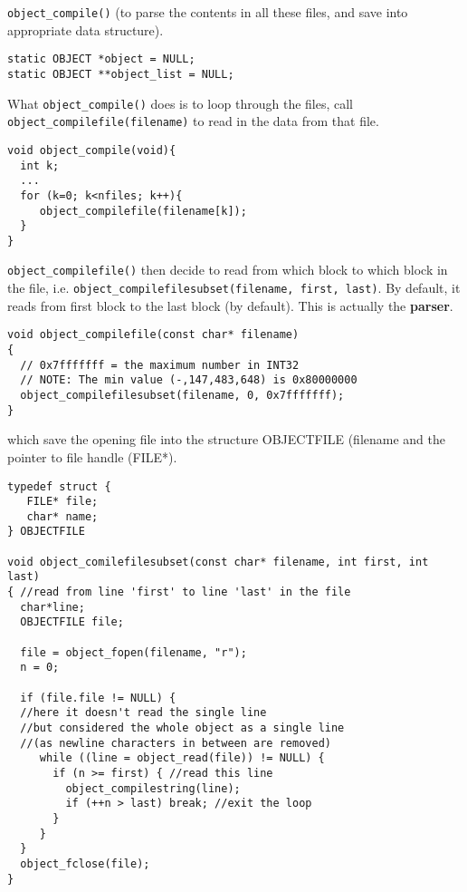 \verb!object_compile()! (to parse the contents in all these files, and save into
appropriate data structure).
\begin{verbatim}
static OBJECT *object = NULL;
static OBJECT **object_list = NULL;
\end{verbatim}
What \verb!object_compile()! does is to loop through the files, call
\verb!object_compilefile(filename)! to read in the data from that file.
\begin{verbatim}
void object_compile(void){
  int k;
  ...
  for (k=0; k<nfiles; k++){
     object_compilefile(filename[k]);
  }
}
\end{verbatim}

\verb!object_compilefile()! then decide to read from which block to which block
in the file, i.e. \verb!object_compilefilesubset(filename, first, last)!. By
default, it reads from first block to the last block (by default). This is
actually the {\bf parser}.
\begin{verbatim}
void object_compilefile(const char* filename)
{
  // 0x7fffffff = the maximum number in INT32
  // NOTE: The min value (-,147,483,648) is 0x80000000
  object_compilefilesubset(filename, 0, 0x7fffffff);
}
\end{verbatim}
which save the opening file into the structure OBJECTFILE (filename and the
pointer to file handle (FILE*).
\begin{lstlisting}
typedef struct {
   FILE* file;
   char* name;
} OBJECTFILE

void object_comilefilesubset(const char* filename, int first, int last)
{ //read from line 'first' to line 'last' in the file
  char*line; 
  OBJECTFILE file;
  
  file = object_fopen(filename, "r");
  n = 0;
  
  if (file.file != NULL) {
  //here it doesn't read the single line
  //but considered the whole object as a single line
  //(as newline characters in between are removed)
     while ((line = object_read(file)) != NULL) {
   	   if (n >= first) { //read this line
   	     object_compilestring(line);
   	     if (++n > last) break; //exit the loop        
   	   }  
     }
  }
  object_fclose(file);
}
\end{lstlisting}

